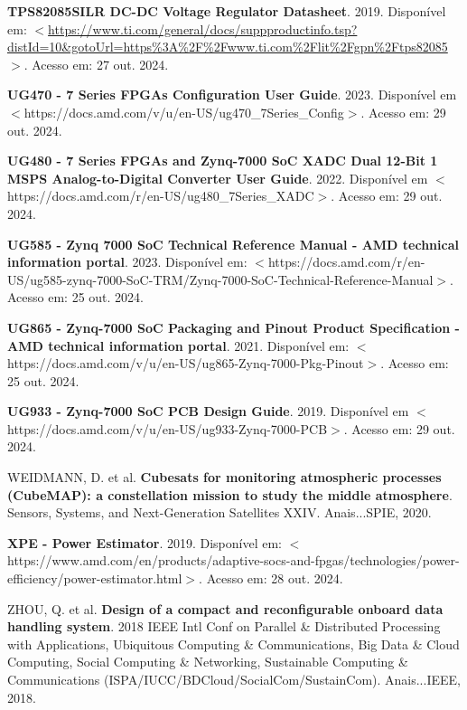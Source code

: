 \begin{flushleft}
\begin{thebibliography}{00}
 \textbf{TPS82085SILR DC-DC Voltage Regulator Datasheet}. 2019. Disponível em: $<$\url{https://www.ti.com/general/docs/suppproductinfo.tsp?distId=10\&gotoUrl=https\%3A\%2F\%2Fwww.ti.com\%2Flit\%2Fgpn\%2Ftps82085}$>$. Acesso em: 27 out. 2024. 

 \textbf{UG470 - 7 Series FPGAs Configuration User Guide}. 2023. Disponível em $<$https://docs.amd.com/v/u/en-US/ug470\_7Series\_Config$>$. Acesso em: 29 out. 2024.

 \textbf{UG480 - 7 Series FPGAs and Zynq-7000 SoC XADC Dual 12-Bit 1 MSPS Analog-to-Digital Converter User Guide}. 2022. Disponível em $<$https://docs.amd.com/r/en-US/ug480\_7Series\_XADC$>$. Acesso em: 29 out. 2024.

 \textbf{UG585 - Zynq 7000 SoC Technical Reference Manual - AMD technical information portal}. 2023. Disponível em: $<$https://docs.amd.com/r/en-US/ug585-zynq-7000-SoC-TRM/Zynq-7000-SoC-Technical-Reference-Manual$>$. Acesso em: 25 out. 2024.

 \textbf{UG865 - Zynq-7000 SoC Packaging and Pinout Product Specification - AMD technical information portal}. 2021. Disponível em: $<$https://docs.amd.com/v/u/en-US/ug865-Zynq-7000-Pkg-Pinout$>$. Acesso em: 25 out. 2024.

 \textbf{UG933 - Zynq-7000 SoC PCB Design Guide}. 2019. Disponível em $<$https://docs.amd.com/v/u/en-US/ug933-Zynq-7000-PCB$>$. Acesso em: 29 out. 2024.

 WEIDMANN, D. et al. \textbf{Cubesats for monitoring atmospheric processes (CubeMAP): a constellation mission to study the middle atmosphere}. Sensors, Systems, and Next-Generation Satellites XXIV. Anais...SPIE, 2020.

 \textbf{XPE - Power Estimator}. 2019. Disponível em: $<$https://www.amd.com/en/products/adaptive-socs-and-fpgas/technologies/power-efficiency/power-estimator.html$>$. Acesso em: 28 out. 2024.

 ZHOU, Q. et al. \textbf{Design of a compact and reconfigurable onboard data handling system}. 2018 IEEE Intl Conf on Parallel \& Distributed Processing with Applications, Ubiquitous Computing \& Communications, Big Data \& Cloud Computing, Social Computing \& Networking, Sustainable Computing \& Communications (ISPA/IUCC/BDCloud/SocialCom/SustainCom). Anais...IEEE, 2018.

\end{thebibliography}
\end{flushleft}

